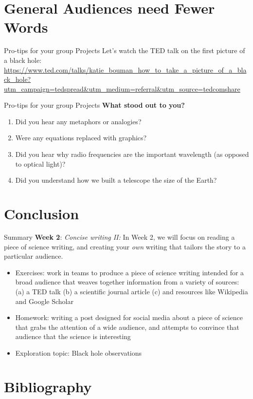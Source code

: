 \documentclass{beamer}
\begin{document}
\section{General Audiences need Fewer Words}

\begin{frame}{Pro-tips for your group Projects}
Let's watch the TED talk on the first picture of a black hole: \\ \vspace{0.5cm}
\url{https://www.ted.com/talks/katie_bouman_how_to_take_a_picture_of_a_black_hole?utm_campaign=tedspread&utm_medium=referral&utm_source=tedcomshare}
\end{frame}

\begin{frame}{Pro-tips for your group Projects}
\textbf{\alert{What stood out to you?}}
\begin{enumerate}
\item Did you hear any metaphors or analogies?
\item Were any equations replaced with graphics?
\item Did you hear why radio frequencies are the important wavelength (as opposed to optical light)?
\item Did you understand how we built a telescope the size of the Earth?
\end{enumerate}
\end{frame}

\section{Conclusion}

\begin{frame}{Summary}
\textbf{Week 2}: \textit{Concise writing II:} In Week 2, we will focus on reading a piece of science writing, and creating your \textit{own} writing that tailors the story to a particular audience.
\begin{itemize}
\item Exercises: work in teams to produce a piece of science writing intended for a broad audience that weaves together information from a variety of sources: (a) a TED talk (b) a scientific journal article (c) and resources like Wikipedia and Google Scholar
\item Homework: writing a post designed for social media about a piece of science that grabs the attention of a wide audience, and attempts to convince that audience that the science is interesting
\item Exploration topic: Black hole observations
\end{itemize}
\end{frame}


\section{Bibliography}


\end{document}
